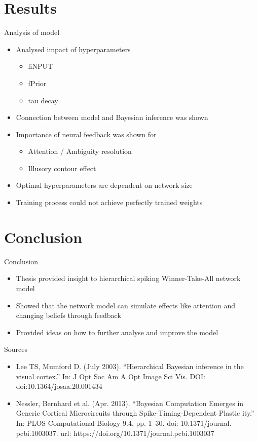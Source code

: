 \documentclass[aspectratio=169]{beamer}
\begin{document}
\section{Results}

\begin{frame}{Analysis of model}
    \begin{itemize}
    \item Analysed impact of hyperparameters
	\begin{itemize}
	  \item fiNPUT
	  \item fPrior
	  \item tau decay
    \end{itemize}	    
    \item Connection between model and Bayesian inference was shown
    \item Importance of neural feedback was shown for 
    \begin{itemize}
	  \item Attention / Ambiguity resolution
	  \item Illusory contour effect
    \end{itemize}  
    \item Optimal hyperparameters are dependent on network size
    \item Training process could not achieve perfectly trained weights  
  \end{itemize}

\end{frame}

\section*{Conclusion}

\begin{frame}{Conclusion}
  \begin{itemize}
	\item Thesis provided insight to hierarchical spiking Winner-Take-All network model
	\item Showed that the network model can simulate effects like attention and changing beliefs through feedback
	\item Provided ideas on how to further analyse and improve the model
  \end{itemize}
\end{frame}


\begin{frame}{Sources}
    \begin{itemize}
    \item  Lee TS, Mumford D. (July 2003). “Hierarchical Bayesian inference in the
 visual cortex.” In: J Opt Soc Am A Opt Image Sci Vis. DOI: doi:10.1364/josaa.20.001434
    \item Nessler, Bernhard et al. (Apr. 2013). “Bayesian Computation Emerges in
 Generic Cortical Microcircuits through Spike-Timing-Dependent Plastic
ity.” In: PLOS Computational Biology 9.4, pp. 1–30. doi: 10.1371/journal.
 pcbi.1003037. url: https://doi.org/10.1371/journal.pcbi.1003037
  \end{itemize}

\end{frame}
\end{document}
